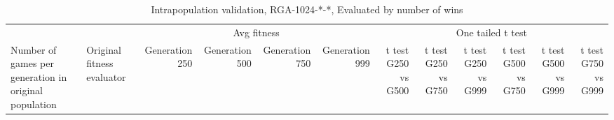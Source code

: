 \begin{landscape}
\begin{table}[ht]
  \centering
  \caption{Intrapopulation validation, RGA-1024-*-*, Evaluated by number of
  wins}
    \begin{tabularx}{\linewidth}{|p{1in}|p{1in}|r|r|r|r|r|r|r|r|r|r|}
\cline{3-12}    \multicolumn{1}{l}{} &  & \multicolumn{4}{c|}{Avg fitness} & \multicolumn{6}{c|}{One tailed t test} \\ \cline{1-12}
    Number of games per generation in original population
    & Original fitness evaluator 
    & \multicolumn{1}{p{0.7in}|}{Generation 250} 
    & \multicolumn{1}{p{0.7in}|}{Generation 500}
    & \multicolumn{1}{p{0.7in}|}{Generation 750}
    & \multicolumn{1}{p{0.7in}|}{Generation 999}
    & \multicolumn{1}{X|}{t test G250 vs G500} 
    & \multicolumn{1}{X|}{t test G250 vs G750}
    & \multicolumn{1}{X|}{t test G250 vs G999}
    & \multicolumn{1}{X|}{t test G500 vs G750}
    & \multicolumn{1}{X|}{t test G500 vs G999}
    & \multicolumn{1}{X|}{t test G750 vs G999} \\ \cline{1-12}


\end{tabularx}
\end{table}
\end{landscape}
